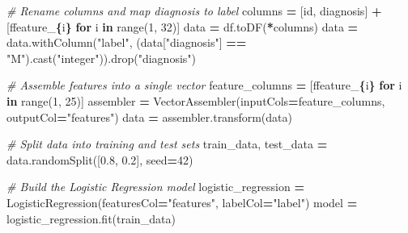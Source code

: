 \documentclass[
]{book}
\newenvironment{Shaded}{\begin{snugshade}}{\end{snugshade}}
\newcommand{\BuiltInTok}[1]{#1}
\newcommand{\CommentTok}[1]{\textcolor[rgb]{0.56,0.35,0.01}{\textit{#1}}}
\newcommand{\ControlFlowTok}[1]{\textcolor[rgb]{0.13,0.29,0.53}{\textbf{#1}}}
\newcommand{\DecValTok}[1]{\textcolor[rgb]{0.00,0.00,0.81}{#1}}
\newcommand{\FloatTok}[1]{\textcolor[rgb]{0.00,0.00,0.81}{#1}}
\newcommand{\KeywordTok}[1]{\textcolor[rgb]{0.13,0.29,0.53}{\textbf{#1}}}
\newcommand{\NormalTok}[1]{#1}
\newcommand{\OperatorTok}[1]{\textcolor[rgb]{0.81,0.36,0.00}{\textbf{#1}}}
\newcommand{\SpecialCharTok}[1]{\textcolor[rgb]{0.81,0.36,0.00}{\textbf{#1}}}
\newcommand{\SpecialStringTok}[1]{\textcolor[rgb]{0.31,0.60,0.02}{#1}}
\newcommand{\StringTok}[1]{\textcolor[rgb]{0.31,0.60,0.02}{#1}}
\begin{document}
\begin{Shaded}
\begin{Highlighting}[]
\CommentTok{\# Rename columns and map diagnosis to label}
\NormalTok{columns }\OperatorTok{=}\NormalTok{ [}\StringTok{\textquotesingle{}id\textquotesingle{}}\NormalTok{, }\StringTok{\textquotesingle{}diagnosis\textquotesingle{}}\NormalTok{] }\OperatorTok{+}\NormalTok{ [}\SpecialStringTok{f\textquotesingle{}feature\_}\SpecialCharTok{\{}\NormalTok{i}\SpecialCharTok{\}}\SpecialStringTok{\textquotesingle{}} \ControlFlowTok{for}\NormalTok{ i }\KeywordTok{in} \BuiltInTok{range}\NormalTok{(}\DecValTok{1}\NormalTok{, }\DecValTok{32}\NormalTok{)]}
\NormalTok{data }\OperatorTok{=}\NormalTok{ df.toDF(}\OperatorTok{*}\NormalTok{columns)}
\NormalTok{data }\OperatorTok{=}\NormalTok{ data.withColumn(}\StringTok{"label"}\NormalTok{, (data[}\StringTok{"diagnosis"}\NormalTok{] }\OperatorTok{==} \StringTok{"M"}\NormalTok{).cast(}\StringTok{"integer"}\NormalTok{)).drop(}\StringTok{"diagnosis"}\NormalTok{)}
\end{Highlighting}
\end{Shaded}

\begin{Shaded}
\begin{Highlighting}[]
\CommentTok{\# Assemble features into a single vector}
\NormalTok{feature\_columns }\OperatorTok{=}\NormalTok{ [}\SpecialStringTok{f\textquotesingle{}feature\_}\SpecialCharTok{\{}\NormalTok{i}\SpecialCharTok{\}}\SpecialStringTok{\textquotesingle{}} \ControlFlowTok{for}\NormalTok{ i }\KeywordTok{in} \BuiltInTok{range}\NormalTok{(}\DecValTok{1}\NormalTok{, }\DecValTok{25}\NormalTok{)]}
\NormalTok{assembler }\OperatorTok{=}\NormalTok{ VectorAssembler(inputCols}\OperatorTok{=}\NormalTok{feature\_columns, outputCol}\OperatorTok{=}\StringTok{"features"}\NormalTok{)}
\NormalTok{data }\OperatorTok{=}\NormalTok{ assembler.transform(data)}
\end{Highlighting}
\end{Shaded}

\begin{Shaded}
\begin{Highlighting}[]
\CommentTok{\# Split data into training and test sets}
\NormalTok{train\_data, test\_data }\OperatorTok{=}\NormalTok{ data.randomSplit([}\FloatTok{0.8}\NormalTok{, }\FloatTok{0.2}\NormalTok{], seed}\OperatorTok{=}\DecValTok{42}\NormalTok{)}

\CommentTok{\# Build the Logistic Regression model}
\NormalTok{logistic\_regression }\OperatorTok{=}\NormalTok{ LogisticRegression(featuresCol}\OperatorTok{=}\StringTok{"features"}\NormalTok{, labelCol}\OperatorTok{=}\StringTok{"label"}\NormalTok{)}
\NormalTok{model }\OperatorTok{=}\NormalTok{ logistic\_regression.fit(train\_data)}
\end{Highlighting}
\end{Shaded}
\end{document}
